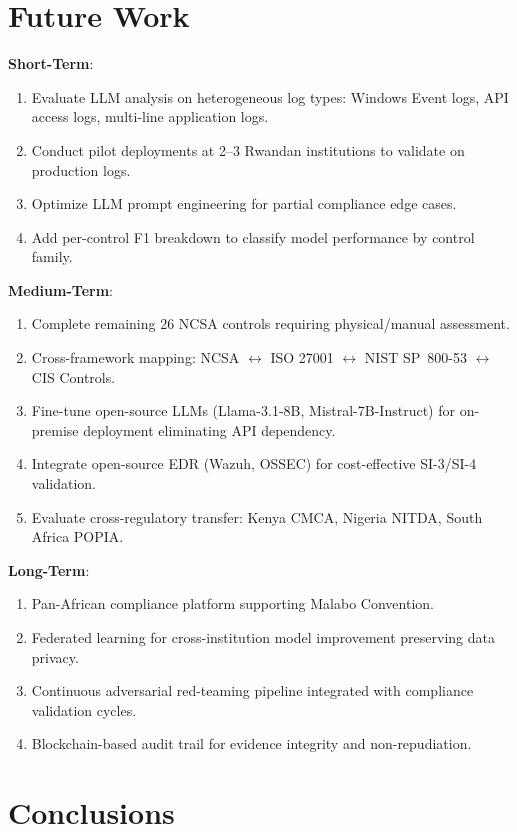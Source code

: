 \documentclass[futureinternet,article,submit,pdftex,moreauthors]{Definitions/mdpi}
\begin{document}
\section{Future Work}
\label{sec:future_work}

\textbf{Short-Term}:
\begin{enumerate}
\item Evaluate LLM analysis on heterogeneous log types: Windows Event logs, API access logs,
multi-line application logs.
\item Conduct pilot deployments at 2--3 Rwandan institutions to validate on production logs.
\item Optimize LLM prompt engineering for partial compliance edge cases.
\item Add per-control F1 breakdown to classify model performance by control family.
\end{enumerate}

\textbf{Medium-Term}:
\begin{enumerate}
\item Complete remaining 26 NCSA controls requiring physical/manual assessment.
\item Cross-framework mapping: NCSA $\leftrightarrow$ ISO 27001 $\leftrightarrow$ NIST
SP~800-53 $\leftrightarrow$ CIS Controls.
\item Fine-tune open-source LLMs (Llama-3.1-8B, Mistral-7B-Instruct) for on-premise
deployment eliminating API dependency.
\item Integrate open-source EDR (Wazuh, OSSEC) for cost-effective SI-3/SI-4 validation.
\item Evaluate cross-regulatory transfer: Kenya CMCA, Nigeria NITDA, South Africa POPIA.
\end{enumerate}

\textbf{Long-Term}:
\begin{enumerate}
\item Pan-African compliance platform supporting Malabo Convention.
\item Federated learning for cross-institution model improvement preserving data privacy.
\item Continuous adversarial red-teaming pipeline integrated with compliance validation cycles.
\item Blockchain-based audit trail for evidence integrity and non-repudiation.
\end{enumerate}

\section{Conclusions}
\label{sec:conclusion}
\end{document}

